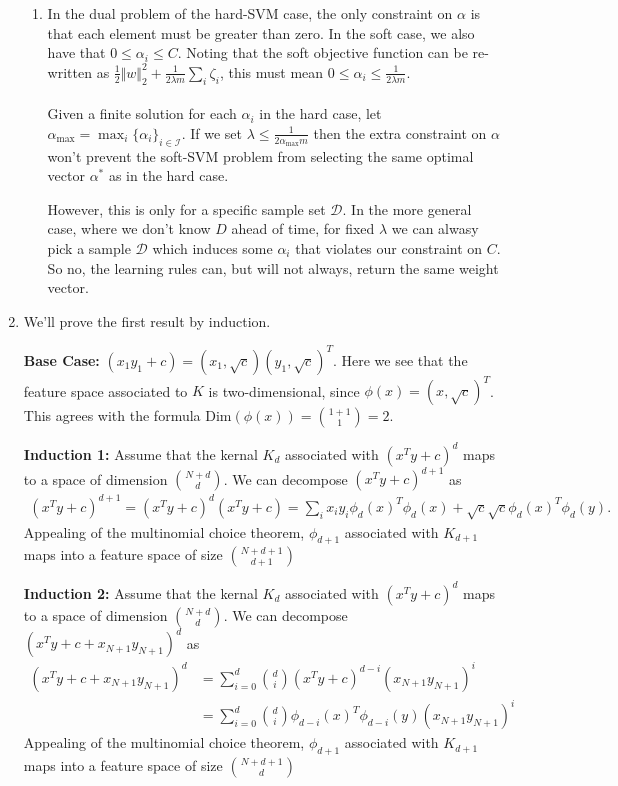 \documentclass[11pt,letter]{article}
\begin{document}
\begin{enumerate}
\begin{enumerate}
    \item In the dual problem of the hard-SVM case, the only constraint on $\alpha$ is that each element must be greater than zero. In the soft case, we also have that $0 \le \alpha_i \le C$. Noting that the soft objective function can be re-written as $\frac{1}{2}\Vert w \Vert_2^2 + \frac{1}{2 \lambda m} \sum_i \zeta_i$, this must mean $0 \le \alpha_i \le \frac{1}{2 \lambda m}$.
    \\ \\
    Given a finite solution for each $\alpha_i$ in the hard case, let $\alpha_{\max} = \max_i \{\alpha_i\}_{i \in \mathcal I}$. If we set $\lambda \le \frac{1}{2 \alpha_{\max} m}$ then the extra constraint on $\alpha$ won't prevent the soft-SVM problem from selecting the same optimal vector $\alpha^*$ as in the hard case. 
    
    However, this is only for a specific sample set $\mathcal D$. In the more general case, where we don't know $D$ ahead of time, for fixed $\lambda$ we can alwasy pick a sample $\mathcal D$ which induces some $\alpha_i$ that violates our constraint on $C$. So no, the learning rules can, but will not always, return the same weight vector.
    \end{enumerate}

\item We'll prove the first result by induction.

\textbf{Base Case:} $(x_1y_1 + c) = (x_1, \sqrt c)(y_1, \sqrt c)^T$. Here we see that the feature space associated to $K$ is two-dimensional, since $\phi(x) = (x, \sqrt c)^T$. This agrees with the formula $\text{Dim}(\phi(x)) = \binom{1+1}{1} = 2$.

\textbf{Induction 1:} Assume that the kernal $K_d$ associated with $(x^Ty + c)^d$ maps to a space of dimension $\binom{N+d}{d}$. We can decompose $(x^Ty + c)^{d+1}$ as
\begin{align*}
    (x^Ty + c)^{d+1} = (x^Ty + c)^d(x^Ty + c) = \sum_ix_iy_i\phi_d(x)^T\phi_d(x) + \sqrt c \sqrt c \phi_d(x)^T\phi_d(y).
\end{align*}
Appealing of the multinomial choice theorem, $\phi_{d+1}$ associated with $K_{d+1}$ maps into a feature space of size $\binom{N+d+1}{d+1}$

\textbf{Induction 2:} Assume that the kernal $K_d$ associated with $(x^Ty + c)^d$ maps to a space of dimension $\binom{N+d}{d}$. We can decompose $(x^Ty + c + x_{N+1}y_{N+1})^{d}$ as
\begin{align*}
    (x^Ty + c + x_{N+1}y_{N+1})^{d} & = \sum_{i=0}^d \binom{d}{i}(x^Ty + c)^{d-i}(x_{N+1}y_{N+1})^i \\ 
    & = \sum_{i=0}^d \binom{d}{i}\phi_{d-i}(x)^T\phi_{d-i}(y)(x_{N+1}y_{N+1})^i
\end{align*}
Appealing of the multinomial choice theorem, $\phi_{d+1}$ associated with $K_{d+1}$ maps into a feature space of size $\binom{N+d+1}{d}$


\end{enumerate}
\end{document}
